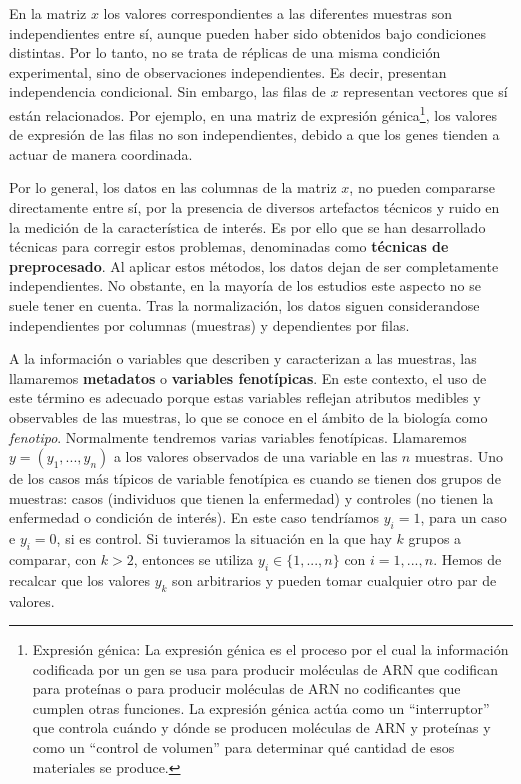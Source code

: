 En la matriz $x$ los valores correspondientes a las diferentes muestras son independientes entre sí, aunque pueden
haber sido obtenidos bajo condiciones distintas. Por lo tanto, no se trata de réplicas de una misma condición
experimental, sino de observaciones independientes. Es decir, presentan independencia condicional. Sin embargo, las
filas de $x$ representan vectores que sí están relacionados. Por ejemplo, en una matriz de expresión génica\footnote[5]{Expresión génica: 
La expresión génica es el proceso por el cual la información codificada por un gen se usa 
para producir moléculas de ARN que codifican para proteínas o para producir moléculas de ARN no codificantes que cumplen otras funciones. La expresión génica
actúa como un “interruptor” que controla cuándo y dónde se producen moléculas de ARN y proteínas y como un “control de volumen” para determinar qué cantidad
de esos materiales se produce.}, los 
valores de expresión de las filas no son independientes, debido a que los genes tienden a actuar de manera coordinada. \newline

Por lo general, los datos en las columnas de la matriz $x$, no pueden compararse directamente entre sí, por la presencia
de diversos artefactos técnicos y ruido en la medición de la característica de interés. Es por ello que se han desarrollado
técnicas para corregir estos problemas, denominadas como \textbf{técnicas de preprocesado}. Al aplicar estos métodos, los
datos dejan de ser completamente independientes. No obstante, en la mayoría de los estudios este aspecto no se suele
tener en cuenta. Tras la normalización, los datos siguen considerandose independientes por columnas (muestras) y dependientes
por filas. \newline

A la información o variables que describen y caracterizan a las muestras, las llamaremos \textbf{metadatos} o 
\textbf{variables fenotípicas}. En este contexto, el uso de este término es adecuado porque estas variables reflejan
atributos medibles y observables de las muestras, lo que se conoce en el ámbito de la biología como \textit{fenotipo}. 
Normalmente tendremos varias variables fenotípicas. 
Llamaremos $y = (y_{1},...,y_{n})$ a los valores observados de una variable en las $n$ muestras. Uno de los casos más típicos
de variable fenotípica es cuando se tienen dos grupos de muestras: casos (individuos que tienen la enfermedad) y controles
(no tienen la enfermedad o condición de interés). En este caso tendríamos $y_{i} = 1$, para un caso e $y_{i} = 0$, si es control.
Si tuvieramos la situación en la que hay $k$ grupos a comparar, con $k > 2$, entonces se utiliza $y_{i} \in \{1,...,n\}$ 
con $i = 1,...,n$. Hemos de recalcar que los valores $y_{k}$ son arbitrarios y pueden tomar cualquier otro par de valores. \newline


